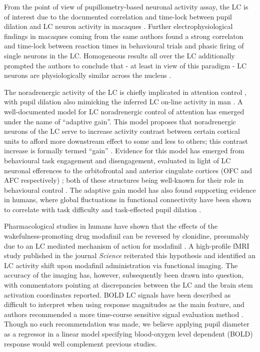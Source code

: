 	From the point of view of pupillometry-based neuronal activity assay, the LC is of interest due to the documented correlation and time-lock between pupil dilation and LC neuron activity in macaques \citep{Rajkowski1994}.
	Further electrophysiological findings in macaques coming from the same authors \citep{Rajkowski2004} found a strong correlaton and time-lock between reaction times in behavioural trials and phasic firing of single neurons in the LC.
	Homogeneous results all over the LC additionally prompted the authors to conclude that - at least in view of this paradigm - LC neurons are physiologically similar across the nucleus \citep{Rajkowski2004}.
	
	The noradrenergic activity of the LC is chiefly implicated in attention control \citep{Aston-Jones1994,Gabay2011}, with pupil dilation also mimicking the inferred LC on-line activity in man \citep{Gabay2011}.
	A well-documented model for LC noradrenergic control of attention has emerged under the name of “adaptive gain”.
	This model proposes that noradrenergic neurons of the LC serve to increase activity contrast between certain cortical units to afford more downstream effect to some and less to others; this contrast increase is formally termed “gain”  \citep{Aston-Jones2005}.
	Evidence for this model has emerged from behavioural task engagement and disengagement, evaluated in light of LC neuronal efferences to the orbitofrontal and anterior cingulate cortices (OFC and AFC respectively) \citep{Aston-Jones2005}; both of these structures being well-known for their role in behavioural control \citep{Baxter2013,Kerns2004}.
	The adaptive gain model has also found supporting evidence in humans, where global fluctuations in functional connectivity have been shown to correlate with task difficulty and task-effected pupil dilation \citep{Eldar2013}.
	
	Pharmacological studies in humans have shown that the effects of the wakefulness-promoting drug \citep{Engber1998} modafinil can be reversed by clonidine, presumably due to an LC mediated mechanism of action for modafinil \citep{Hou2005}.
	A high-profile fMRI study published in the journal \textit{Science} reiterated this hypothesis and identified an LC activity shift upon modafinil administration via functional imaging\citep{Minzenberg2008}.
	The accuracy of the imaging has, however, subsequently been drawn into question, with commentators \citep{Astafiev2010} pointing at discrepancies between the LC and the brain stem activation coordinates reported.  
	BOLD LC signals have been described as difficult to interpret when using response magnitudes as the main feature, and authors recommended a more time-course sensitive signal evaluation method \citep{Astafiev2010}.
	Though no such recommendation was made, we believe applying pupil diameter as a regressor in a linear model specifying blood-oxygen level dependent (BOLD) response would well complement previous studies. 

